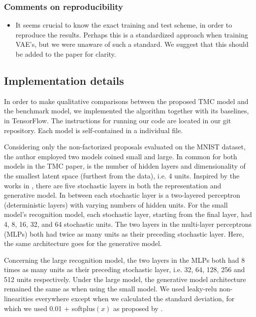 \documentclass{article}
\begin{document}
\subsubsection*{Comments on reproducibility}
\begin{itemize}
    \item It seems crucial to know the exact training and test scheme, in order to reproduce the results. Perhaps this is a standardized approach when training VAE's, but we were unaware of such a standard. We suggest that this should be added to the paper for clarity.
\end{itemize}

\subsection{Implementation details}
\label{sec:imp_details}
In order to make qualitative comparisons between the proposed TMC model and the benchmark model, we implemented the algorithm together with its baselines, in TensorFlow. The instructions for running our code are located in our git repository. Each model is self-contained in a individual file. 

Considering only the non-factorized proposals evaluated on the MNIST dataset, the author employed two models coined small and large. In common for both models in the TMC paper, is the number of hidden layers and dimensionality of the smallest latent space (furthest from the data), i.e. 4 units. Inspired by the works in \cite{ladder}, there are five stochastic layers in both the representation and generative model. In between each stochastic layer is a two-layered perceptron (deterministic layers) with varying numbers of hidden units. For the small model's recognition model, each stochastic layer, starting from the final layer, had 4, 8, 16, 32, and 64 stochastic units. The two layers in the multi-layer perceptrons (MLPs) both had twice as many units as their preceding stochastic layer. Here, the same architecture goes for the generative model. 

Concerning the large recognition model, the two layers in the MLPs both had 8 times as many units as their preceding stochastic layer, i.e. 32, 64, 128, 256 and 512 units respectively. Under the large model, the generative model architecture remained the same as when using the small model. We used leaky-relu non-linearities everywhere except when we calculated the standard deviation, for which we used 0.01 + softplus$(x)$ as proposed by \cite{tmc}. 
\end{document}
